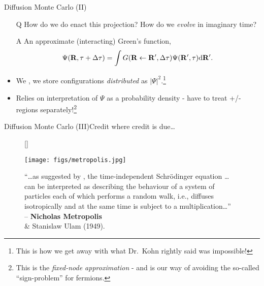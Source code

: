 \documentclass[12pt, pdf, hyperref={draft}, usenames, dvipsnames]{beamer}
\newcommand{\dd}{\mathrm{d}}
\newcommand{\red}[1]{{\bf\color{LancsRed}{#1}}}
\newcommand{\green}[1]{{\bf\color{ForestGreen}{#1}}}
\begin{document}
\begin{frame}{Diffusion Monte Carlo (II)}

\begin{itemize}
  \item [Q] How do we do enact this projection? How do we \textit{evolve} in
  imaginary time?

  \item [A] An approximate (interacting) Green's function,
  \begin{equation}
  \Psi({\bf R}, \tau+\Delta \tau)
  = \displaystyle\int G({\bf R} \leftarrow {\bf R'},\Delta \tau)
  \Psi({\bf R'}, \tau) \dd{\bf R'}.
  \end{equation}

  \item We \green{don't represent / store $\Psi$}, we store configurations
  \textit{distributed} as $\lvert\Psi\rvert^2$.\footnote{This is how we get
  away with what Dr.\ Kohn rightly said was impossible!}

  \item \red{Caveats:} Relies on interpretation of $\Psi$ as a probability
  density - have to treat +/- regions separately!\footnote{This is the
  \textit{fixed-node approximation} - and is our way of avoiding the so-called
  ``sign-problem'' for fermions.}
\end{itemize}

\end{frame}

\begin{frame}{Diffusion Monte Carlo (III)}{Credit where credit is due\ldots}

\begin{figure}[H]
  [\FBwidth]
  {\caption*{``\ldots as suggested by \green{Fermi}, the time-independent
  Schr\"{o}dinger equation \ldots can be interpreted as describing the
  behaviour of a system of particles each of which performs a random walk,
  i.e., diffuses isotropically and at the same time is subject to a
  multiplication\ldots'' \\ \hfill -- {{\bf Nicholas Metropolis} \\
  \hfill \& Stanislaw Ulam (1949)}.}\label{fig:metropolis}}
  {\texttt{[image: figs/metropolis.jpg]}}
\end{figure}

\end{frame}
\end{document}
